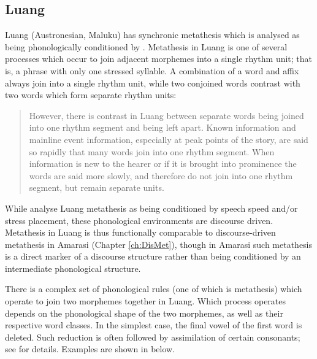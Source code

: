 \subsection{Luang}\label{sec:Lua}
Luang (Austronesian, Maluku) has synchronic metathesis
which is analysed as being phonologically conditioned by \citet{tata15}.
Metathesis in Luang is one of several processes which occur to
join adjacent morphemes into a single rhythm unit;
that is, a phrase with only one stressed syllable.
A combination of a word and affix always join into a single rhythm unit,
while two conjoined words contrast with two words which form separate rhythm units:

\begin{quote}
However, there is contrast in Luang between separate
words being joined into one rhythm segment and being left apart.
Known information and mainline event information,
especially at peak points of the story,
are said so rapidly that many words join into one rhythm segment.
When information is new to the hearer or if it is brought into prominence the words are said more
slowly, and therefore do not join into one rhythm segment, but remain separate units. \hfill\citep[24]{tata15}
\end{quote}

While \cite{tata15} analyse Luang metathesis as being conditioned by speech speed and/or stress placement,
these phonological environments are discourse driven.
Metathesis in Luang is thus functionally comparable to
discourse-driven metathesis in Amarasi (Chapter \ref{ch:DisMet}),
though in Amarasi such metathesis is a direct marker of a discourse structure
rather than being conditioned by an intermediate phonological structure.

There is a complex set of phonological rules (one of which is metathesis)
which operate to join two morphemes together in Luang.
Which process operates depends on the phonological shape of the two morphemes,
as well as their respective word classes.
In the simplest case, the final vowel of the first word is deleted.
Such reduction is often followed by assimilation of certain consonants;
see \citet[25]{tata15} for details.
Examples are shown in  below.

\begin{exe}
	\label{ex:LuaVowDel}
\end{exe}

